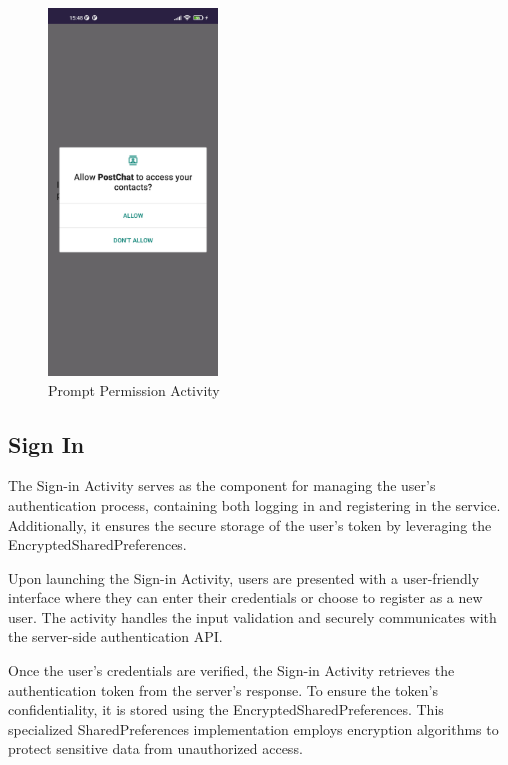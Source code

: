 \begin{figure}[!ht]
	\centering
	\includegraphics[trim={0cm 0cm 0 0cm}, width=0.4\textwidth]{./Chapter6/Figures/Permission access}
	\caption{Prompt Permission Activity}
	\label{fig:PA1}
\end{figure}

\newpage

\subsection{Sign In}

The Sign-in Activity serves as the component for managing the user's authentication process, containing both logging in and registering in the service. Additionally, it ensures the secure storage of the user's token by leveraging the EncryptedSharedPreferences.

Upon launching the Sign-in Activity, users are presented with a user-friendly interface where they can enter their credentials or choose to register as a new user. The activity handles the input validation and securely communicates with the server-side authentication API.

Once the user's credentials are verified, the Sign-in Activity retrieves the authentication token from the server's response. To ensure the token's confidentiality, it is stored using the EncryptedSharedPreferences. This specialized SharedPreferences implementation employs encryption algorithms to protect sensitive data from unauthorized access.

